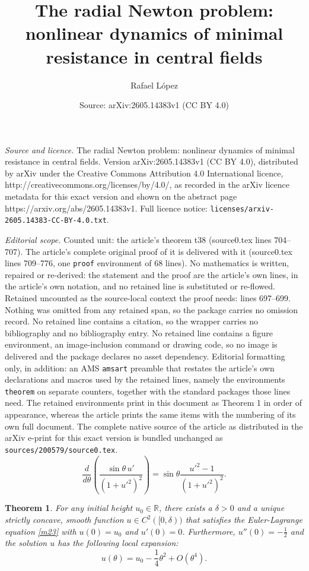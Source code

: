 \documentclass[10pt,a4paper]{amsart}
\title{The radial Newton problem: nonlinear dynamics of minimal resistance in central fields}
\author{Rafael L\'opez}
\date{Source: arXiv:2605.14383v1 (CC BY 4.0)}
\newtheorem{theorem}{Theorem}
\begin{document}
\maketitle

\noindent\emph{Source and licence.} The radial Newton problem: nonlinear dynamics of minimal resistance in central fields. Version arXiv:2605.14383v1 (CC BY 4.0), distributed by arXiv under the Creative Commons Attribution 4.0 International licence, http://creativecommons.org/licenses/by/4.0/, as recorded in the arXiv licence metadata for this exact version and shown on the abstract page https://arxiv.org/abs/2605.14383v1. Full licence notice: \texttt{licenses/arxiv-2605.14383-CC-BY-4.0.txt}.\par\smallskip

\noindent\textit{Editorial scope.} Counted unit: the article's theorem t38 (source0.tex lines 704--707). The article's complete original proof of it is delivered with it (source0.tex lines 709--776, one \texttt{proof} environment of 68 lines). No mathematics is written, repaired or re-derived: the statement and the proof are the article's own lines, in the article's own notation, and no retained line is substituted or re-flowed.  Retained uncounted as the source-local context the proof needs: lines 697--699.  Nothing was omitted from any retained span, so the package carries no omission record.  No retained line contains a citation, so the wrapper carries no bibliography and no bibliography entry.  No retained line contains a figure environment, an image-inclusion command or drawing code, so no image is delivered and the package declares no asset dependency.  Editorial formatting only, in addition: an AMS \texttt{amsart} preamble that restates the article's own declarations and macros used by the retained lines, namely the environments \texttt{theorem} on separate counters, together with the standard packages those lines need.  The retained environments print in this document as Theorem 1 in order of appearance, whereas the article prints the same items with the numbering of its own full document.  The complete native source of the article as distributed in the arXiv e-print for this exact version is bundled unchanged as \texttt{sources/200579/source0.tex}.
\begin{equation}\label{m23}
 \frac{d}{d\theta} \left( \frac{\sin\theta \, u'}{(1 + u'^2)^2} \right) = \sin\theta \frac{u'^2 - 1}{(1 + u'^2)^2}.
\end{equation}

\begin{theorem} \label{t38}
For any initial height $u_0 \in \mathbb{R}$, there exists a $\delta > 0$ and a unique strictly concave, smooth function $u \in C^2([0, \delta))$ that satisfies the Euler-Lagrange equation \eqref{m23} with $u(0) = u_0$ and $u'(0) = 0$. Furthermore, $u''(0) = -\frac12$ and the solution $u$ has the following local expansion:
$$u(\theta) = u_0 - \frac{1}{4}\theta^2 + O(\theta^4).$$
\end{theorem}
\end{document}
